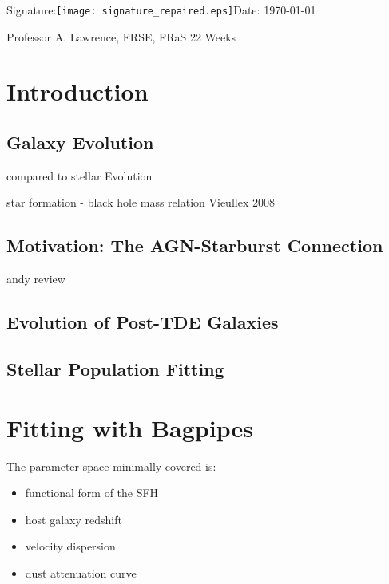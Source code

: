 \documentclass[a4paper,11pt]{article}
\begin{document}
\hspace*{1cm}Signature:\hspace*{1cm}\texttt{[image: signature\_repaired.eps]}\hspace*{1cm}Date: \today

\vfill
{} Professor A. Lawrence, FRSE, FRaS
\hfill
22 Weeks

\newpage
\setcounter{page}{1} %
\tableofcontents

\newpage
\section{Introduction}\label{sec:introduction}
\subsection{Galaxy Evolution}
compared to stellar Evolution

star formation - black hole mass relation Vieullex 2008
\subsection{Motivation: The AGN-Starburst Connection}\label{sec:agn_starburst_connection}
andy review

\subsection{Evolution of Post-TDE Galaxies}

\subsection{Stellar Population Fitting}\label{sec:stellar_population_fitting}

\section{Fitting with Bagpipes}\label{sec:fitting_with_bagpipes}

The parameter space minimally covered is:

\begin{itemize}
  \item functional form of the SFH
  \item host galaxy redshift
  \item velocity dispersion
  \item dust attenuation curve
\end{itemize}
\end{document}
